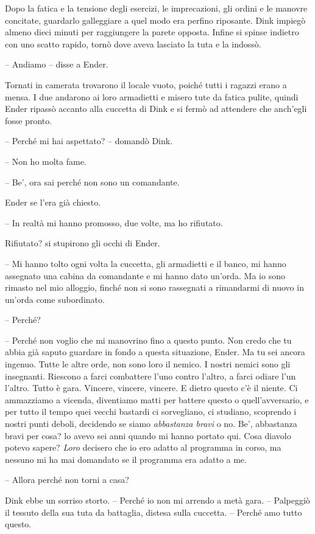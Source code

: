 {Dopo la fatica e la tensione degli esercizi, le imprecazioni, gli
	ordini e le manovre concitate, guardarlo galleggiare a quel modo era
	perfino riposante. Dink impiegò almeno dieci minuti per raggiungere la
	parete opposta. Infine si spinse indietro con uno scatto rapido, tornò
	dove aveva lasciato la tuta e la indossò.}

{-- Andiamo -- disse a Ender.}

{Tornati in camerata trovarono il locale vuoto, poiché tutti i ragazzi
	erano a mensa. I due andarono ai loro armadietti e misero tute da fatica
	pulite, quindi Ender ripassò accanto alla cuccetta di Dink e si fermò ad
	attendere che anch'egli fosse pronto.}

{-- Perché mi hai aspettato? -- domandò Dink.}

{-- Non ho molta fame.}

{-- Be', ora sai perché non sono un comandante.}

{Ender se l'era già chiesto.}

{-- In realtà mi hanno promosso, due volte, ma ho rifiutato.}

{Rifiutato? si stupirono gli occhi di Ender.}

{-- Mi hanno tolto ogni volta la cuccetta, gli armadietti e il banco, mi
	hanno assegnato una cabina da comandante e mi hanno dato un'orda. Ma io
	sono rimasto nel mio alloggio, finché non si sono rassegnati a
	rimandarmi di nuovo in un'orda come subordinato.}

{-- Perché?}

{-- Perché non voglio che mi manovrino fino a questo punto. Non credo
	che tu abbia già saputo guardare in fondo a questa situazione, Ender. Ma
	tu sei ancora ingenuo. Tutte le altre orde, non sono loro il nemico. I
	nostri nemici sono gli insegnanti. Riescono a farci combattere l'uno
	contro l'altro, a farci odiare l'un l'altro. Tutto è gara. Vincere,
	vincere, vincere. E dietro questo c'è il niente. Ci ammazziamo a
	vicenda, diventiamo matti per battere questo o quell'avversario, e per
	tutto il tempo quei vecchi bastardi ci sorvegliano, ci studiano,
	scoprendo i nostri punti deboli, decidendo se siamo \emph{abbastanza
		bravi} o no. Be', abbastanza bravi per cosa? lo avevo sei anni quando mi
	hanno portato qui. Cosa diavolo potevo sapere? \emph{Loro} decisero che
	io ero adatto al programma in corso, ma nessuno mi ha mai domandato se
	il programma era adatto a me.}

{-- Allora perché non torni a casa?}

{Dink ebbe un sorriso storto. -- Perché io non mi arrendo a metà gara.
	-- Palpeggiò il tessuto della sua tuta da battaglia, distesa sulla
	cuccetta. -- Perché amo tutto questo.}

